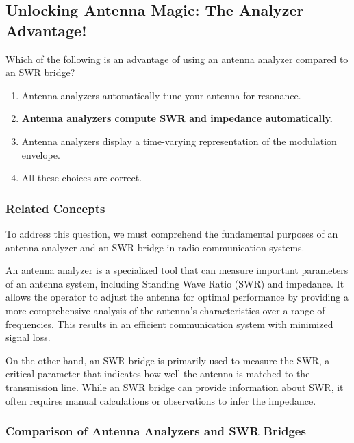 \subsection{Unlocking Antenna Magic: The Analyzer Advantage!}

\begin{tcolorbox}[colback=gray!10, colframe=black, title=E4A07] 

Which of the following is an advantage of using an antenna analyzer compared to an SWR bridge?
\begin{enumerate}[label=\Alph*.]
    \item Antenna analyzers automatically tune your antenna for resonance.
    \item \textbf{Antenna analyzers compute SWR and impedance automatically.}
    \item Antenna analyzers display a time-varying representation of the modulation envelope.
    \item All these choices are correct.
\end{enumerate} \end{tcolorbox}

\subsubsection{Related Concepts}

To address this question, we must comprehend the fundamental purposes of an antenna analyzer and an SWR bridge in radio communication systems. 

An antenna analyzer is a specialized tool that can measure important parameters of an antenna system, including Standing Wave Ratio (SWR) and impedance. It allows the operator to adjust the antenna for optimal performance by providing a more comprehensive analysis of the antenna's characteristics over a range of frequencies. This results in an efficient communication system with minimized signal loss.

On the other hand, an SWR bridge is primarily used to measure the SWR, a critical parameter that indicates how well the antenna is matched to the transmission line. While an SWR bridge can provide information about SWR, it often requires manual calculations or observations to infer the impedance.

\subsubsection{Comparison of Antenna Analyzers and SWR Bridges}

